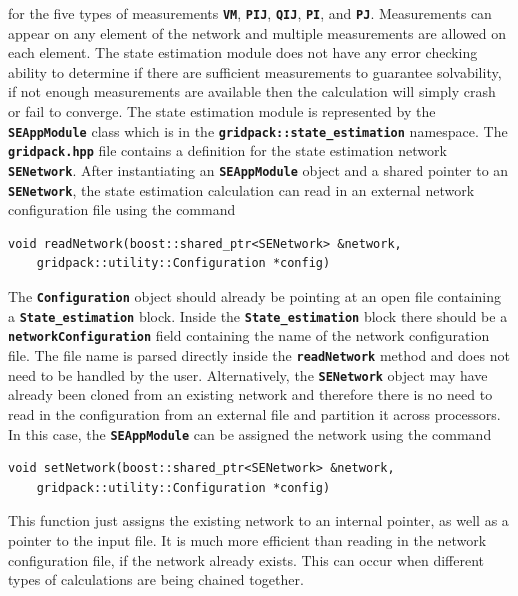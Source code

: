 \documentclass[12pt]{report} %
\begin{document}
for the five types of measurements \texttt{\textbf{VM}}, \texttt{\textbf{PIJ}}, \texttt{\textbf{QIJ}}, \texttt{\textbf{PI}}, and \texttt{\textbf{PJ}}. Measurements can appear on any element of the network and multiple measurements are allowed on each element. The state estimation module does not have any error checking ability to determine if there are sufficient measurements to guarantee solvability, if not enough measurements are available then the calculation will simply crash or fail to converge.
The state estimation module is represented by the \texttt{\textbf{SEAppModule}} class which is in the \texttt{\textbf{gridpack::state\_estimation}} namespace. The \texttt{\textbf{gridpack.hpp}} file contains a definition for the state estimation network \texttt{\textbf{SENetwork}}. After instantiating an \texttt{\textbf{SEAppModule}} object and a shared pointer to an \texttt{\textbf{SENetwork}}, the state estimation calculation can read in an external network configuration file using the command

{
\color{red}
\begin{Verbatim}[fontseries=b]
void readNetwork(boost::shared_ptr<SENetwork> &network,
    gridpack::utility::Configuration *config)
\end{Verbatim}
}

The \texttt{\textbf{Configuration}} object should already be pointing at an open file containing a \texttt{\textbf{State\_estimation}} block. Inside the \texttt{\textbf{State\_estimation}} block there should be a \texttt{\textbf{networkConfiguration}} field containing the name of the network configuration file. The file name is parsed directly inside the \texttt{\textbf{readNetwork}} method and does not need to be handled by the user.
Alternatively, the \texttt{\textbf{SENetwork}} object may have already been cloned from an existing network and therefore there is no need to read in the configuration from an external file and partition it across processors. In this case, the \texttt{\textbf{SEAppModule}} can be assigned the network using the command

{
\color{red}
\begin{Verbatim}[fontseries=b]
void setNetwork(boost::shared_ptr<SENetwork> &network,
    gridpack::utility::Configuration *config)
\end{Verbatim}
}

This function just assigns the existing network to an internal pointer, as well as a pointer to the input file. It is much more efficient than reading in the network configuration file, if the network already exists. This can occur when different types of calculations are being chained together.
\end{document}
